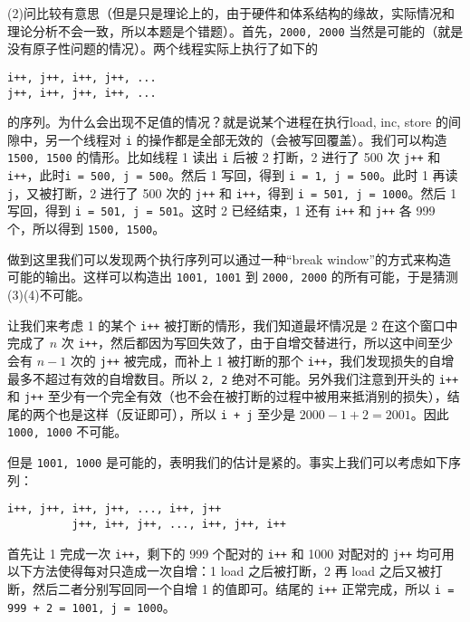 \begin{problems}
        (2)问比较有意思（但是只是理论上的，由于硬件和体系结构的缘故，实际情况和理论分析不会一致，所以本题是个错题）。首先，\verb|2000, 2000| 当然是可能的（就是没有原子性问题的情况）。两个线程实际上执行了如下的
        \begin{center}
            \verb|i++, j++, i++, j++, ...| \\
            \verb|j++, i++, j++, i++, ...|
        \end{center}
        的序列。为什么会出现不足值的情况？就是说某个进程在执行load, inc, store 的间隙中，另一个线程对 \verb|i| 的操作都是全部无效的（会被写回覆盖）。我们可以构造 \verb|1500, 1500| 的情形。比如线程 1 读出 \verb|i| 后被 2 打断，2 进行了 500 次 \verb|j++| 和 \verb|i++|，此时\verb|i = 500, j = 500|。然后 1 写回，得到 \verb|i = 1, j = 500|。此时 1 再读 \verb|j|，又被打断，2 进行了 500 次的 \verb|j++| 和 \verb|i++|，得到 \verb|i = 501, j = 1000|。然后 1 写回，得到 \verb|i = 501, j = 501|。这时 2 已经结束，1 还有 \verb|i++| 和 \verb|j++| 各 999 个，所以得到 \verb|1500, 1500|。
        
        做到这里我们可以发现两个执行序列可以通过一种“break window”的方式来构造可能的输出。这样可以构造出 \verb|1001, 1001| 到 \verb|2000, 2000| 的所有可能，于是猜测(3)(4)不可能。
        
        让我们来考虑 1 的某个 \verb|i++| 被打断的情形，我们知道最坏情况是 2 在这个窗口中完成了 $n$ 次 \verb|i++|，然后都因为写回失效了，由于自增交替进行，所以这中间至少会有 $n-1$ 次的 \verb|j++| 被完成，而补上 1 被打断的那个 \verb|i++|，我们发现损失的自增最多不超过有效的自增数目。所以 \verb|2, 2| 绝对不可能。另外我们注意到开头的 \verb|i++| 和 \verb|j++| 至少有一个完全有效（也不会在被打断的过程中被用来抵消别的损失），结尾的两个也是这样（反证即可），所以 \verb|i + j| 至少是 $2000-1+2=2001$。因此 \verb|1000, 1000| 不可能。
        
        但是 \verb|1001, 1000| 是可能的，表明我们的估计是紧的。事实上我们可以考虑如下序列：
        \begin{center}
            \verb|i++, j++, i++, j++, ..., i++, j++| \\
            \verb|          j++, i++, j++, ..., i++, j++, i++|
        \end{center}
        首先让 1 完成一次 \verb|i++|，剩下的 999 个配对的 \verb|i++| 和 1000 对配对的 \verb|j++| 均可用以下方法使得每对只造成一次自增：1 load 之后被打断，2 再 load 之后又被打断，然后二者分别写回同一个自增 1 的值即可。结尾的 \verb|i++| 正常完成，所以 \verb|i = 999 + 2 = 1001, j = 1000|。


\end{problems}
